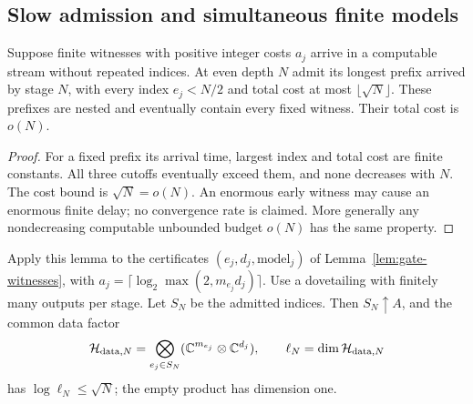 \subsection{Slow admission and simultaneous finite models}
\begin{lemma}\label{lem:gate-schedule}
Suppose finite witnesses with positive integer costs $a_j$ arrive in a computable stream without repeated indices. At even depth $N$ admit its longest prefix arrived by stage $N$, with every index $e_j<N/2$ and total cost at most $\lfloor\sqrt N\rfloor$. These prefixes are nested and eventually contain every fixed witness. Their total cost is $o(N)$.
\end{lemma}
\begin{proof}
For a fixed prefix its arrival time, largest index and total cost are finite constants. All three cutoffs eventually exceed them, and none decreases with $N$. The cost bound is $\sqrt N=o(N)$. An enormous early witness may cause an enormous finite delay; no convergence rate is claimed. More generally any nondecreasing computable unbounded budget $o(N)$ has the same property.
\end{proof}

Apply this lemma to the certificates $(e_j,d_j,\text{model}_j)$ of Lemma~\ref{lem:gate-witnesses}, with $a_j=\lceil\log_2\max(2,m_{e_j}d_j)\rceil$. Use a dovetailing with finitely many outputs per stage. Let $S_N$ be the admitted indices. Then $S_N\uparrow A$, and the common data factor
\[
 \mathcal H_{{\rm data},N}=\bigotimes_{e_j\in S_N}(\mathbb C^{m_{e_j}}\otimes\mathbb C^{d_j}),
 \qquad \ell_N=\dim\mathcal H_{{\rm data},N}
\]
has $\log \ell_N\le\sqrt N$; the empty product has dimension one.

